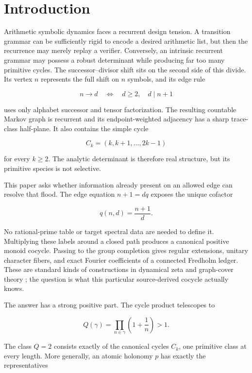 \section{Introduction}
\label{sec:introduction}

Arithmetic symbolic dynamics faces a recurrent design tension.  A transition
grammar can be sufficiently rigid to encode a desired arithmetic list, but
then the recurrence may merely replay a verifier.  Conversely, an intrinsic
recurrent grammar may possess a robust determinant while producing far too
many primitive cycles.  The successor--divisor shift sits on the second side
of this divide.  Its vertex \(n\) represents the full shift on \(n\) symbols,
and its edge rule

\[
 n\longrightarrow d
 \quad\Longleftrightarrow\quad d\ge2,\quad d\mid n+1
\]

uses only alphabet successor and tensor factorization.  The resulting
countable Markov graph is recurrent and its endpoint-weighted adjacency has a
sharp trace-class half-plane.  It also contains the simple cycle

\[
 C_k=(k,k+1,\ldots,2k-1)
\]

for every \(k\ge2\).  The analytic determinant is therefore real structure,
but its primitive species is not selective.

This paper asks whether information already present on an allowed edge can
resolve that flood.  The edge equation \(n+1=dq\) exposes the unique
cofactor

\[
 q(n,d)=\frac{n+1}{d}.
\]

No rational-prime table or target spectral data are needed to define it.
Multiplying these labels around a closed path produces a canonical positive
monoid cocycle.  Passing to the group completion gives regular extensions,
unitary character fibers, and exact Fourier coefficients of a connected
Fredholm ledger.  These are standard kinds of constructions in dynamical
zeta and graph-cover theory
\citep{BowenLanford1970,AdachiSunada1987,GrossTucker1977,StarkTerras1996};
the question is what this particular source-derived cocycle actually knows.

The answer has a strong positive part.  The cycle product telescopes to

\[
 Q(\gamma)=\prod_{n\in\gamma}\left(1+\frac1n\right)>1.
\]

The class \(Q=2\) consists exactly of the canonical cycles \(C_k\), one
primitive class at every length.  More generally, an atomic holonomy \(p\)
has exactly the representatives

